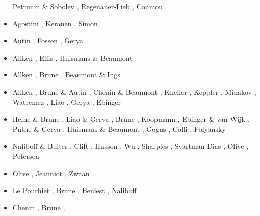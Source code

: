 \begin{scriptsize}
\begin{itemize}
                         Petrunin \& Sobolev \cite{peso08}, Regenauer-Lieb \etal \cite{rerw08},
                         Coumou \etal \cite{codh08}
\item[\twothousandnine] Agostini \etal \cite{agcz09}, Keranen \etal \cite{kekj09},
                        Simon \etal \cite{sihb09}
\item[\twothousandten] Autin \etal \cite{aubh10}, Fossen \etal \cite{fosr10}, 
                       Gerya \cite{gerya2010}
\item[\twothousandeleven] Allken \etal \cite{alht11}, Ellis \etal \cite{ellw11},
                          Huismans \& Beaumont \cite{hube11}
\item[\twothousandtwelve] Allken \etal \cite{alht12}, Brune \etal \cite{brps12},
                          Beaumont \& Ings \cite{bein12}
\item[\twothousandthirteen] Allken \etal \cite{alhf13}, Brune \& Autin \cite{brau13},
                            Chenin \& Beaumont \cite{chbe13}, Kneller \etal \cite{knak13},
                            Keppler \etal \cite{kern13}, Minakov \etal \cite{mipf13},
                            Watremez \etal \cite{wabd13}, Liao \etal \cite{ligw13}, 
                            Gerya \cite{gery13c,gery13}, Ebinger \etal \cite{ebvk13}
\item[\twothousandfourteen] Heine \& Brune \cite{hebr14}, Liao \& Gerya \cite{lige14,lige14b},
                            Brune \cite{brun14}, Koopmann \etal \cite{kobf14},
                            Ebinger \& van Wijk \cite{ebva14}, Puthe \& Gerya \cite{puge14},
                            Huismans \& Beaumont \cite{hube14},
                            Gogus \cite{gogu14}, 
                            Colli \etal \cite{cosb14}, Polyansky \etal \cite{pokb14}
\item[\twothousandfifteen] Naliboff \& Buiter \cite{nabu15}, Clift \etal \cite{clbq15}, 
                     Husson \etal \cite{huyb15}, Wu \etal \cite{wulc15},
                     Sharples \etal \cite{shmj15}, Svartman Dias \etal \cite{svlh15},
                     Olive \etal \cite{olbi15}, Petersen \etal \cite{pean15}
\item[\twothousandsixteen] Olive \etal \cite{olbm16}, Jeanniot \etal \cite{jekm16},
                     Zwaan \etal \cite{zwsn16}
\item[\twothousandseventeen] Le Pourhiet \etal \cite{lemh17}, Brune \etal \cite{brcr17},
                       Beniest \etal \cite{bekb17}, Naliboff \etal \cite{nabp17}
\item[\twothousandeighteen] Chenin \etal \cite{chsm18}, Brune \etal \cite{brwm18},

\end{itemize}
\end{scriptsize}

